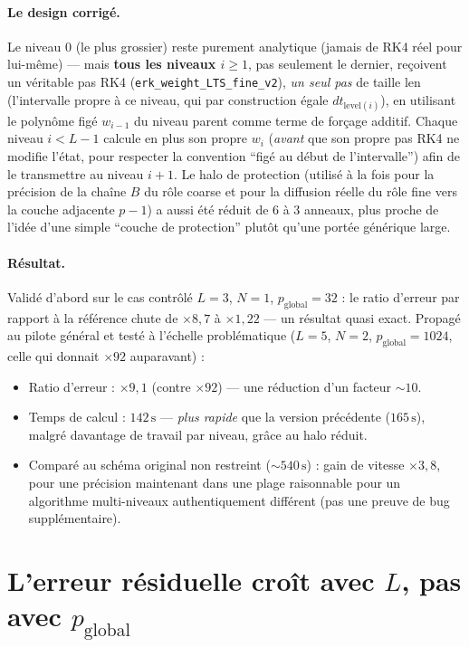 \documentclass[11pt]{article}
\newcommand{\code}[1]{\texttt{#1}}
\begin{document}
\paragraph{Le design corrigé.} Le niveau 0 (le plus grossier) reste
purement analytique (jamais de RK4 réel pour lui-même) --- mais
\textbf{tous les niveaux $i\geq1$}, pas seulement le dernier, reçoivent
un véritable pas RK4 (\code{erk\_weight\_LTS\_fine\_v2}), \emph{un seul
pas} de taille $\mathrm{len}$ (l'intervalle propre à ce niveau, qui par
construction égale $dt_{\text{level}(i)}$), en utilisant le polynôme
figé $w_{i-1}$ du niveau parent comme terme de forçage additif. Chaque
niveau $i<L-1$ calcule en plus son propre $w_i$ (\emph{avant} que son
propre pas RK4 ne modifie l'état, pour respecter la convention ``figé au
début de l'intervalle'') afin de le transmettre au niveau $i+1$. Le halo
de protection (utilisé à la fois pour la précision de la chaîne $B$ du
rôle coarse et pour la diffusion réelle du rôle fine vers la couche
adjacente $p{-}1$) a aussi été réduit de 6 à 3 anneaux, plus proche de
l'idée d'une simple ``couche de protection'' plutôt qu'une portée
générique large.

\paragraph{Résultat.} Validé d'abord sur le cas contrôlé $L=3$, $N=1$,
$p_{\text{global}}=32$ : le ratio d'erreur par rapport à la référence
chute de $\times 8{,}7$ à $\times 1{,}22$ --- un résultat quasi exact.
Propagé au pilote général et testé à l'échelle problématique ($L=5$,
$N=2$, $p_{\text{global}}=1024$, celle qui donnait $\times 92$
auparavant) :
\begin{itemize}
  \item Ratio d'erreur : $\times 9{,}1$ (contre $\times 92$) --- une
  réduction d'un facteur $\sim 10$.
  \item Temps de calcul : $142\,\mathrm{s}$ --- \emph{plus rapide} que la
  version précédente ($165\,\mathrm{s}$), malgré davantage de travail par
  niveau, grâce au halo réduit.
  \item Comparé au schéma original non restreint ($\sim 540\,\mathrm{s}$) :
  gain de vitesse $\times 3{,}8$, pour une précision maintenant dans une
  plage raisonnable pour un algorithme multi-niveaux authentiquement
  différent (pas une preuve de bug supplémentaire).
\end{itemize}

\section{L'erreur résiduelle croît avec $L$, pas avec $p_{\text{global}}$}
\label{sec:lgrowth}
\end{document}
